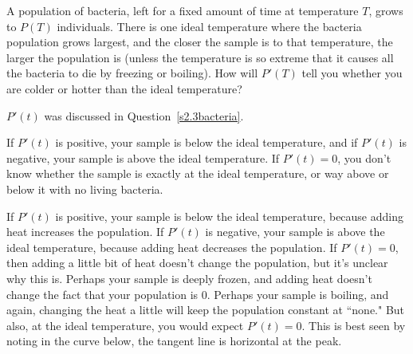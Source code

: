 \begin{Mquestion}A population of bacteria, left for a fixed amount of time at temperature $T$, grows to $P(T)$ individuals. There is one ideal temperature where the bacteria population grows largest, and the closer the sample is to that temperature, the larger the population is (unless the temperature is so extreme that it causes all the bacteria to die by freezing or boiling). How will $P'(T)$ tell you whether you are colder or hotter than the ideal temperature?
\end{Mquestion}
\begin{hint} $P'(t)$ was discussed in Question~\ref{s2.3bacteria}.
\end{hint}
\begin{answer}  If $P'(t)$ is positive, your sample is below the ideal temperature, and if $P'(t)$ is negative, your sample is above the ideal temperature. If $P'(t) = 0$, you don't know whether the sample is exactly at the ideal temperature, or way above or below it with no living bacteria.
\end{answer}
\begin{solution} If $P'(t)$ is positive, your sample is below the ideal temperature, because
adding heat increases the population. If $P'(t)$ is negative, your sample is above the ideal temperature, because adding heat decreases the population. If $P'(t)=0$, then adding a little bit of heat doesn't change the population, but it's unclear why this is. Perhaps your sample is deeply frozen, and adding heat doesn't change the fact that your population is 0. Perhaps your sample is boiling, and again, changing the heat a little will keep the population constant at ``none." But also, at the ideal temperature, you would expect $P'(t)=0$. This is best seen by noting in the curve below, the tangent line is horizontal at the peak.
\begin{center}
\end{center}
\end{solution}
